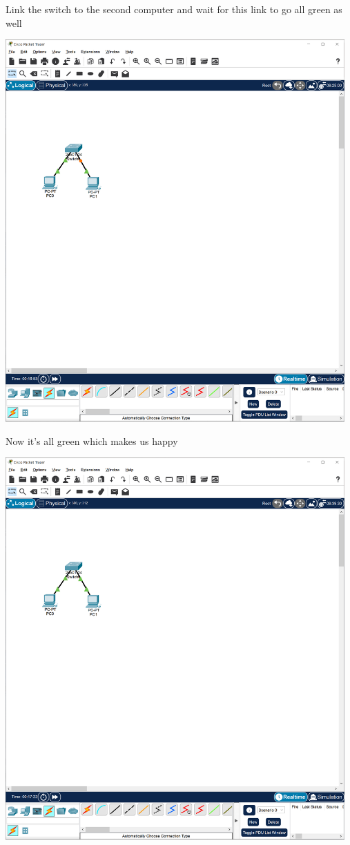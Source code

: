 \documentclass[a4paper,12pt]{article}
\begin{document}
\noindent Link the switch to the second computer and wait for this link to go all green as well \newline

\noindent \includegraphics[width=13cm]{./step-by-step/9.PNG}
\clearpage

\noindent Now it's all green which makes us happy \newline

\noindent \includegraphics[width=13cm]{./step-by-step/10.PNG}
\clearpage
\end{document}
